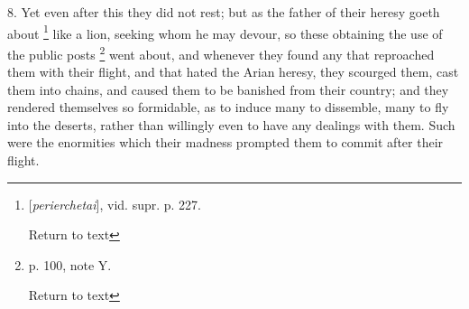 8. Yet even after this they did not rest; but as
the father of their heresy goeth about \footnote{[\emph{perierchetai}], vid. supr. p. 227.

Return to text} like a lion, seeking whom he may devour, so these obtaining
the use of the public posts \footnote{p. 100, note Y.

Return to text} went about, and whenever they found any that reproached them
with their flight, and that hated the Arian heresy, they scourged
them, cast them into chains, and caused them to be banished from their
country; and they rendered themselves so formidable, as to induce many
to dissemble, many to fly into the deserts, rather than willingly even
to have any dealings with them. Such were the enormities which their
madness prompted them to commit after their flight.

